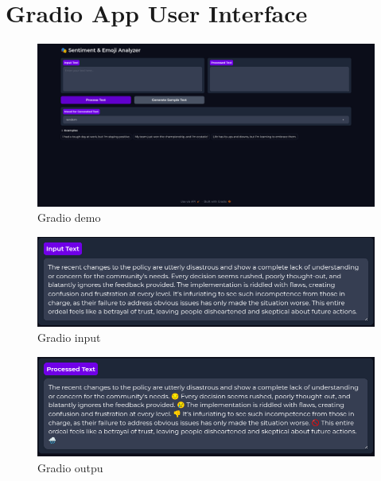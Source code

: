\documentclass{article}
\begin{document}
\section{Gradio App User Interface}\label{sec:demo_ui}
\begin{figure}[h!]
  \centering
  \includegraphics[width=1\textwidth]{demo.png} 
  \caption{Gradio demo}
  \label{fig:your-label}
\end{figure}
\begin{figure}[h!]
  \centering
  \includegraphics[width=1\textwidth]{demo_input.png} 
  \caption{Gradio input}
  \label{fig:your-label}
\end{figure}
\begin{figure}[h!]
  \centering
  \includegraphics[width=1\textwidth]{demo_output.png} 
  \caption{Gradio outpu}
  \label{fig:your-label}
\end{figure}
\end{document}
